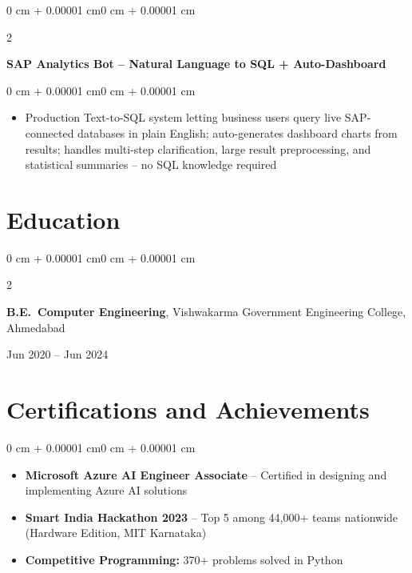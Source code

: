 \documentclass[10pt, letterpaper]{article}
\newenvironment{highlights}{
    \begin{itemize}[
        topsep=0.01 cm,
        parsep=0.01 cm,
        partopsep=0pt,
        itemsep=0pt,
        leftmargin=0 cm + 10pt
    ]
}{
    \end{itemize}
}
\newenvironment{highlightsforbulletentries}{
    \begin{itemize}[
        topsep=0.01 cm,
        parsep=0.01 cm,
        partopsep=0pt,
        itemsep=0pt,
        leftmargin=10pt
    ]
}{
    \end{itemize}
}
\newenvironment{onecolentry}{
    \begin{adjustwidth}{0 cm + 0.00001 cm}{0 cm + 0.00001 cm}
}{
    \end{adjustwidth}
}
\newenvironment{twocolentry}[2][]{
    \onecolentry
    \def\secondColumn{#2}
    \setcolumnwidth{\fill, 5.5 cm}
    \begin{paracol}{2}
}{
    \switchcolumn \raggedleft \secondColumn
    \end{paracol}
    \endonecolentry
}
\begin{document}
        \vspace{0.05 cm}

        \begin{twocolentry}{
            2024
        }
            \textbf{SAP Analytics Bot -- Natural Language to SQL + Auto-Dashboard}
        \end{twocolentry}

        \vspace{0.02 cm}
        \begin{onecolentry}
            \begin{highlights}
                \item Production Text-to-SQL system letting business users query live SAP-connected databases in plain English; auto-generates dashboard charts from results; handles multi-step clarification, large result preprocessing, and statistical summaries -- no SQL knowledge required
            \end{highlights}
        \end{onecolentry}

    \section{Education}

        \begin{twocolentry}{
            Jun 2020 -- Jun 2024
        }
            \textbf{B.E.\ Computer Engineering}, Vishwakarma Government Engineering College, Ahmedabad
        \end{twocolentry}

    \section{Certifications and Achievements}

    \begin{onecolentry}
        \begin{highlightsforbulletentries}
            \item \textbf{Microsoft Azure AI Engineer Associate} -- Certified in designing and implementing Azure AI solutions
            \item \textbf{Smart India Hackathon 2023} -- Top 5 among 44,000+ teams nationwide (Hardware Edition, MIT Karnataka)
            \item \textbf{Competitive Programming:} 370+ problems solved in Python
        \end{highlightsforbulletentries}
    \end{onecolentry}
\end{document}
